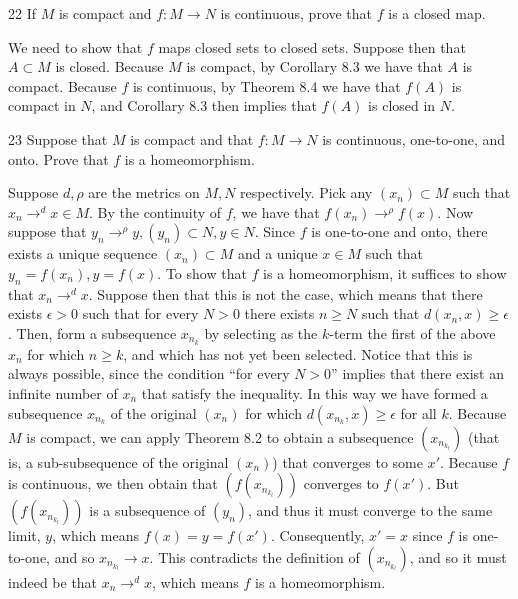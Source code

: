 \begin{exercise}{22}
    If $M$ is compact and $f: M \rightarrow N$ is continuous, prove that $f$ is a closed map.
\end{exercise}

\begin{solution}
    
    We need to show that $f$ maps closed sets to closed sets.
    Suppose then that $A \subset M$ is closed.
    Because $M$ is compact, by Corollary 8.3 we have that $A$ is compact.
    Because $f$ is continuous, by Theorem 8.4 we have that $f(A)$ is compact in $N$, and Corollary 8.3 then implies that $f(A)$ is closed in $N$.
\end{solution}

\begin{exercise}{23}
    Suppose that $M$ is compact and that $f: M \rightarrow N$ is continuous, one-to-one, and onto.
    Prove that $f$ is a homeomorphism.
\end{exercise}

\begin{solution}
    
    Suppose $d, \rho$ are the metrics on $M, N$ respectively.
    Pick any $(x_n) \subset M$ such that $x_n \rightarrow^{d} x \in M$.
    By the continuity of $f$, we have that $f(x_n) \rightarrow^{\rho} f(x)$.
    Now suppose that $y_n \rightarrow^{\rho} y, (y_n) \subset N, y \in N$.
    Since $f$ is one-to-one and onto, there exists a unique sequence $(x_n) \subset M$ and a unique $x \in M$ such that $y_n = f(x_n), y = f(x)$.
    To show that $f$ is a homeomorphism, it suffices to show that $x_n \rightarrow^{d} x$.
    Suppose then that this is not the case, which means that there exists $\epsilon > 0$ such that for every $N > 0$ there exists $n \geq N$ such that $d(x_n, x) \geq \epsilon$.
    Then, form a subsequence $x_{n_k}$ by selecting as the $k$-term the first of the above $x_n$ for which $n \geq k$, and which has not yet been selected.
    Notice that this is always possible, since the condition ``for every $N > 0$'' implies that there exist an infinite number of $x_n$ that satisfy the inequality.
    In this way we have formed a subsequence $x_{n_k}$ of the original $(x_n)$ for which $d(x_{n_k}, x) \geq \epsilon$ for all $k$.
    Because $M$ is compact, we can apply Theorem 8.2 to obtain a subsequence $(x_{n_{k_l}})$ (that is, a sub-subsequence of the original $(x_n)$) that converges to some $x'$.
    Because $f$ is continuous, we then obtain that $(f(x_{n_{k_l}}))$ converges to $f(x')$.
    But $(f(x_{n_{k_l}}))$ is a subsequence of $(y_n)$, and thus it must converge to the same limit, $y$, which means $f(x) = y = f(x')$.
    Consequently, $x' = x$ since $f$ is one-to-one, and so $x_{n_{k_l}} \rightarrow x$.
    This contradicts the definition of $(x_{n_{k_l}})$, and so it must indeed be that $x_n \rightarrow^{d} x$, which means $f$ is a homeomorphism.
\end{solution}


